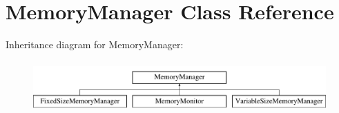 \hypertarget{classMemoryManager}{\section{\-Memory\-Manager \-Class \-Reference}
\label{classMemoryManager}
}
\-Inheritance diagram for \-Memory\-Manager\-:\begin{figure}[H]
\begin{center}
\leavevmode
\includegraphics[height=1.975309cm]{classMemoryManager}
\end{center}
\end{figure}
